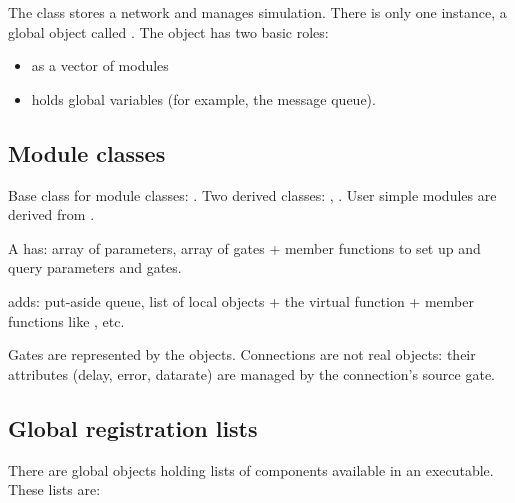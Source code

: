 The  class stores a network and manages simulation.
There is only one instance, a global object called .
The object has two basic roles:
\begin{itemize}
  \item{as a vector of modules}
  \item{holds global variables (for example, the message queue).}
\end{itemize}





\subsection{Module classes}

Base class for module classes: . Two derived classes:
, .  User simple
modules are derived from .

A  has: array of parameters, array of gates + member
functions to set up and query parameters and gates.

 adds: put-aside queue, list of local objects + the
virtual function  + member functions like
,  etc.

Gates are represented by the  objects.
Connections are not real objects: their attributes (delay, error,
datarate) are managed by the connection's source gate.





\subsection{Global registration lists}

There are global objects holding lists of components available
in an {\opp} executable. These lists are:


